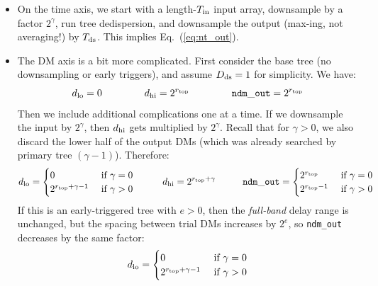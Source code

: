 \documentclass{article}
\numberwithin{equation}{section}   %
\begin{document}
\begin{itemize}

\item On the time axis, we start with a length-$T_{\rm in}$ input array,
  downsample by a factor $2^\gamma$, run tree dedispersion,
  and downsample the output (max-ing, not averaging!) by $T_{\rm ds}$. 
  This implies Eq.\ (\ref{eq:nt_out}).

\item The DM axis is a bit more complicated. First consider the base tree (no downsampling
  or early triggers), and assume $D_{\rm ds}=1$ for simplicity. We have:
  \begin{equation}
   d_{\rm lo} = 0
     \hspace{1.5cm}
   d_{\rm hi} = 2^{r_{\rm top}}
     \hspace{1.5cm}
   {\tt ndm\_out} = 2^{r_{\rm top}}
  \end{equation}
  Then we include additional complications one at a time.
  If we downsample the input by $2^\gamma$, then $d_{\rm hi}$ gets multiplied by $2^\gamma$.
  Recall that for $\gamma > 0$, we also discard the lower half of the output DMs (which was already searched by primary tree $(\gamma-1)$).
  Therefore:
  \begin{equation}
   d_{\rm lo} = \begin{cases}
        0 & \mbox{ if } \gamma = 0 \\
        2^{r_{\rm top} + \gamma - 1} & \mbox{ if } \gamma > 0
   \end{cases}
     \hspace{1cm}
   d_{\rm hi} = 2^{r_{\rm top} + \gamma}
     \hspace{1cm}
   {\tt ndm\_out} = \begin{cases}
     2^{r_{\rm top}} & \mbox{ if } \gamma = 0 \\
     2^{r_{\rm top}-1} & \mbox{ if } \gamma > 0 \\
  \end{cases}
  \end{equation}
  If this is an early-triggered tree with $e > 0$, then the {\em full-band} delay
  range is unchanged, but the spacing between trial DMs increases by $2^e$, so
  {\tt ndm\_out} decreases by the same factor:
  \begin{equation}
   d_{\rm lo} = \begin{cases}
        0 & \mbox{ if } \gamma = 0 \\
        2^{r_{\rm top} + \gamma - 1} & \mbox{ if } \gamma > 0
   \end{cases}

\end{equation}
\end{itemize}
\end{document}
